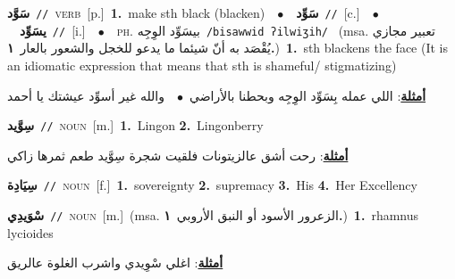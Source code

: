 \documentclass[10pt,a4paper,twoside]{article} %
\begin{document}
\begin{multicols}{2}
{\setlength\topsep{0pt}\textbf{\foreignlanguage{arabic}{سَوَّد}}\ {\color{gray}\texttt{//}\color{black}}\ \textsc{verb}\ [p.]\ \textbf{1.}~make sth black (blacken)\ \ $\bullet$\ \ \setlength\topsep{0pt}\textbf{\foreignlanguage{arabic}{سَوِّد}}\ {\color{gray}\texttt{//}\color{black}}\ [c.]\ \ $\bullet$\ \ \setlength\topsep{0pt}\textbf{\foreignlanguage{arabic}{يسَوِّد}}\ {\color{gray}\texttt{//}\color{black}}\ [i.]\ \ $\bullet$\ \ \textsc{ph.} \color{gray} \foreignlanguage{arabic}{بيسَوِّد الوِجِه}\color{black}\ {\color{gray}\texttt{/{\sffamily bisawwid ʔilwiʒih}/}\color{black}}\ \color{gray} (msa. \foreignlanguage{arabic}{تعبير مجازي يُقْصَد به أنّ شيئما ما يدعو للخجل والشعور بالعار}~\foreignlanguage{arabic}{\textbf{١.}})\color{black}\ \textbf{1.}~sth blackens the face (It is an idiomatic expression that means that sth is shameful/ stigmatizing)\  \begin{flushright}\color{gray}\foreignlanguage{arabic}{\textbf{\underline{\foreignlanguage{arabic}{أمثلة}}}: اللي عمله بِسَوِّد الوِجِه وبحطنا بالأراضي\ $\bullet$\ \  والله غير أسوِّد عيشتك يا أحمد}\end{flushright}\color{black}} \vspace{2mm}

{\setlength\topsep{0pt}\textbf{\foreignlanguage{arabic}{سِوَّيد}}\ {\color{gray}\texttt{//}\color{black}}\ \textsc{noun}\ [m.]\ \textbf{1.}~Lingon  \textbf{2.}~Lingonberry\  \begin{flushright}\color{gray}\foreignlanguage{arabic}{\textbf{\underline{\foreignlanguage{arabic}{أمثلة}}}: رحت أشق عالزيتونات فلقيت شجرة سِوَّيد طعم ثمرها زاكي}\end{flushright}\color{black}} \vspace{2mm}

{\setlength\topsep{0pt}\textbf{\foreignlanguage{arabic}{سِيَادِة}}\ {\color{gray}\texttt{//}\color{black}}\ \textsc{noun}\ [f.]\ \textbf{1.}~sovereignty  \textbf{2.}~supremacy  \textbf{3.}~His  \textbf{4.}~Her Excellency\ } \vspace{2mm}

{\setlength\topsep{0pt}\textbf{\foreignlanguage{arabic}{سْوَيدِي}}\ {\color{gray}\texttt{//}\color{black}}\ \textsc{noun}\ [m.]\ \color{gray}(msa. \foreignlanguage{arabic}{الزعرور الأسود أو النبق الأروبي}~\foreignlanguage{arabic}{\textbf{١.}})\color{black}\ \textbf{1.}~rhamnus lycioides\  \begin{flushright}\color{gray}\foreignlanguage{arabic}{\textbf{\underline{\foreignlanguage{arabic}{أمثلة}}}: اغلي سْوِيدي واشرب الغلوة عالريق}\end{flushright}\color{black}} \vspace{2mm}


\end{multicols}
\end{document}
